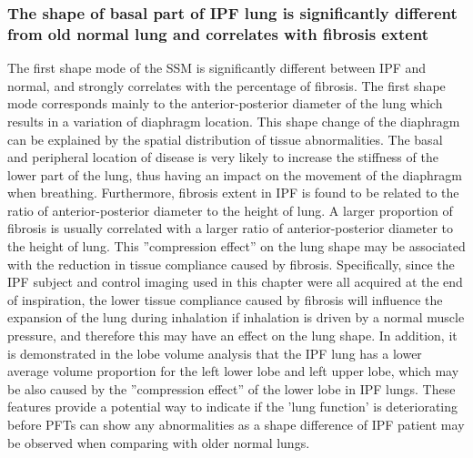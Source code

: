 \subsubsection{The shape of basal part of IPF lung is significantly different from old normal lung and correlates with fibrosis extent}
The first shape mode of the SSM is significantly different between IPF and normal, and strongly correlates with the percentage of fibrosis. The first shape mode corresponds mainly to the anterior-posterior diameter of the lung which results in a variation of diaphragm location. This shape change of the diaphragm can be explained by the spatial distribution of tissue abnormalities. The basal and peripheral location of disease is very likely to increase the stiffness of the lower part of the lung, thus having an impact on the movement of the diaphragm when breathing. Furthermore, fibrosis extent in IPF is found to be related to the ratio of anterior-posterior diameter to the height of lung. A larger proportion of fibrosis is usually correlated with a larger ratio of anterior-posterior diameter to the height of lung. This ''compression effect'' on the lung shape may be associated with the reduction in tissue compliance caused by fibrosis. Specifically, since the IPF subject and control imaging used in this chapter were all acquired at the end of inspiration, the lower tissue compliance caused by fibrosis will influence the expansion of the lung during inhalation if inhalation is driven by a normal muscle pressure, and therefore this may have an effect on the lung shape. In addition, it is demonstrated in the lobe volume analysis that the IPF lung has a lower average volume proportion for the left lower lobe and left upper lobe, which may be also caused by the ''compression effect'' of the lower lobe in IPF lungs. These features provide a potential way to indicate if the 'lung function' is deteriorating before PFTs can show any abnormalities as a shape difference of IPF patient may be observed when comparing with older normal lungs.

